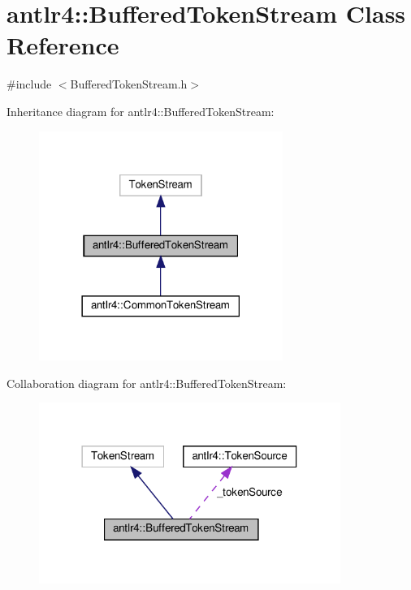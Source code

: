 \hypertarget{classantlr4_1_1BufferedTokenStream}{}\section{antlr4\+:\+:Buffered\+Token\+Stream Class Reference}
\label{classantlr4_1_1BufferedTokenStream}


{\ttfamily \#include $<$Buffered\+Token\+Stream.\+h$>$}



Inheritance diagram for antlr4\+:\+:Buffered\+Token\+Stream\+:
\nopagebreak
\begin{figure}[H]
\begin{center}
\leavevmode
\includegraphics[width=225pt]{classantlr4_1_1BufferedTokenStream__inherit__graph}
\end{center}
\end{figure}


Collaboration diagram for antlr4\+:\+:Buffered\+Token\+Stream\+:
\nopagebreak
\begin{figure}[H]
\begin{center}
\leavevmode
\includegraphics[width=278pt]{classantlr4_1_1BufferedTokenStream__coll__graph}
\end{center}
\end{figure}
